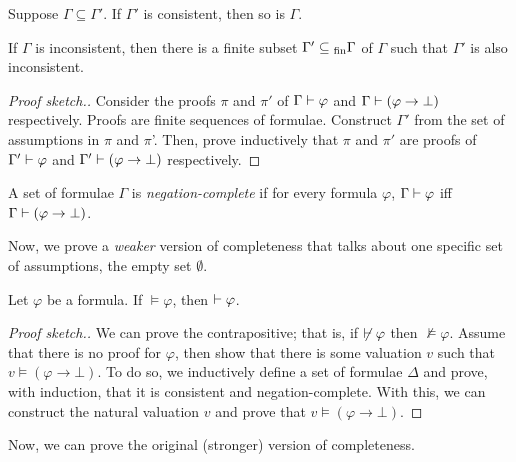 \documentclass[11pt,usenames, dvipsnames]{article}
\begin{document}
\begin{claim}
  Suppose $\Gamma \subseteq \Gamma'$. If $\Gamma'$ is consistent, then so is $\Gamma$.
\end{claim}

\begin{lemma}
  If $\Gamma$ is inconsistent, then there is a finite subset $\Gamma' \subseteq\textsubscript{fin} \Gamma$ of $\Gamma$ such that $\Gamma'$ is also inconsistent.
\end{lemma}

\begin{proof}[Proof sketch.]
  Consider the proofs $\pi$ and $\pi'$ of $\Gamma \vdash \varphi$ and $\Gamma \vdash (\varphi \to \bot)$ respectively. Proofs are finite sequences of formulae. Construct $\Gamma'$ from the set of assumptions in $\pi$ and $\pi$'. Then, prove inductively that $\pi$ and $\pi'$ are proofs of $\Gamma' \vdash \varphi$ and $\Gamma' \vdash (\varphi \to \bot)$ respectively.
\end{proof}

\begin{definition}
  A set of formulae $\Gamma$ is \emph{negation-complete} if for every formula $\varphi$, $\Gamma \vdash \varphi$ iff $\Gamma \vdash (\varphi \to \bot)$.
\end{definition}

Now, we prove a \emph{weaker} version of completeness that talks about one specific set of assumptions, the empty set $\emptyset$.

\begin{theorem}
  Let $\varphi$ be a formula. If $\models \varphi$, then $\vdash \varphi$.
\end{theorem}

\begin{proof}[Proof sketch.]
  We can prove the contrapositive; that is, if $\not\vdash \varphi$ then $\not\models \varphi$. Assume that there is no proof for $\varphi$, then show that there is some valuation $v$ such that $v \models (\varphi \to \bot)$. To do so, we inductively define a set of formulae $\Delta$ and prove, with induction, that it is consistent and negation-complete. With this, we can construct the natural valuation $v$ and prove that $v \models (\varphi \to \bot)$.
\end{proof}

Now, we can prove the original (stronger) version of completeness.
\end{document}
